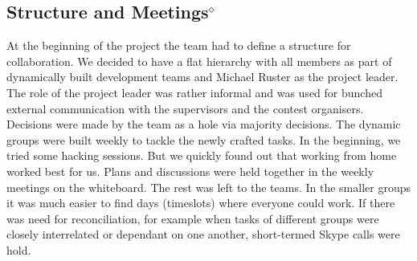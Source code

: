 \subsection{Structure and Meetings$^\diamond$}
At the beginning of the project the team had to define a structure for collaboration. We decided to have a flat hierarchy with all members as part of dynamically built development teams and Michael Ruster as the project leader. The role of the project leader was rather informal and was used for bunched external communication with the supervisors and the contest organisers. Decisions were made by the team as a hole via majority decisions. The dynamic groups were built weekly to tackle the newly crafted tasks. In the beginning, we tried some hacking sessions. But we quickly found out that working from home worked best for us. Plans and discussions were held together in the weekly meetings on the whiteboard. The rest was left to the teams. In the smaller groups it was much easier to find days (timeslots) where everyone could work. If there was need for reconciliation, for example when tasks of different groups were closely interrelated or dependant on one another, short-termed Skype calls were hold. 


